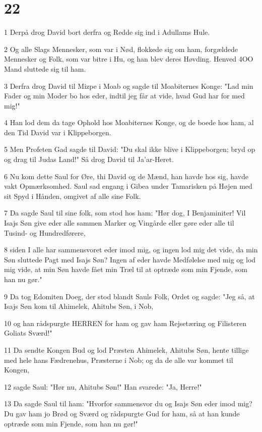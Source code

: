 \chapter{22}

\par 1 Derpå drog David bort derfra og Redde sig ind i Adullams Hule.
\par 2 Og alle Slags Mennesker, som var i Nød, flokkede sig om ham, forgældede Mennesker og Folk, som var bitre i Hu, og han blev deres Høvding. Henved 4OO Mand sluttede sig til ham.
\par 3 Derfra drog David til Mizpe i Moab og sagde til Moabiternes Konge: "Lad min Fader og min Moder bo hos eder, indtil jeg får at vide, hvad Gud har for med mig!"
\par 4 Han lod dem da tage Ophold hos Moabiternes Konge, og de boede hos ham, al den Tid David var i Klippeborgen.
\par 5 Men Profeten Gad sagde til David: "Du skal ikke blive i Klippeborgen; bryd op og drag til Judas Land!" Så drog David til Ja'ar-Heret.
\par 6 Nu kom dette Saul for Øre, thi David og de Mænd, han havde hos sig, havde vakt Opmærksomhed. Saul sad engang i Gibea under Tamarisken på Højen med sit Spyd i Hånden, omgivet af alle sine Folk.
\par 7 Da sagde Saul til sine folk, som stod hos ham: "Hør dog, I Benjaminiter! Vil Isajs Søn give eder alle sammen Marker og Vingårde eller gøre eder alle til Tusind- og Hundredførere,
\par 8 siden I alle har sammensvoret eder imod mig, og ingen lod mig det vide, da min Søn sluttede Pagt med Isajs Søn? Ingen af eder havde Medfølelse med mig og lod mig vide, at min Søn havde fået min Træl til at optræde som min Fjende, som han nu gør."
\par 9 Da tog Edomiten Doeg, der stod blandt Sauls Folk, Ordet og sagde: "Jeg så, at Isajs Søn kom til Ahimelek, Ahitubs Søn, i Nob,
\par 10 og han rådspurgte HERREN for ham og gav ham Rejsetæring og Filisteren Goliats Sværd!"
\par 11 Da sendte Kongen Bud og lod Præsten Ahimelek, Ahitubs Søn, hente tillige med hele hans Fædrenehus, Præsterne i Nob; og da de alle var kommet til Kongen,
\par 12 sagde Saul: "Hør nu, Ahitubs Søn!" Han svarede: "Ja, Herre!"
\par 13 Da sagde Saul til ham: "Hvorfor sammensvor du og Isajs Søn eder imod mig? Du gav ham jo Brød og Sværd og rådspurgte Gud for ham, så at han kunde optræde som min Fjende, som han nu gør!"
